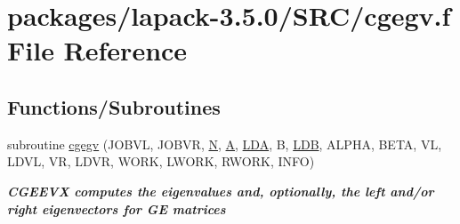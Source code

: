 \hypertarget{cgegv_8f}{}\section{packages/lapack-\/3.5.0/\+S\+R\+C/cgegv.f File Reference}
\label{cgegv_8f}
\subsection*{Functions/\+Subroutines}
\begin{DoxyCompactItemize}
\item 
subroutine \hyperlink{group__complexGEeigen_ga193cdd210dd5b0451503fddee82947e1}{cgegv} (J\+O\+B\+V\+L, J\+O\+B\+V\+R, \hyperlink{polmisc_8c_a0240ac851181b84ac374872dc5434ee4}{N}, \hyperlink{classA}{A}, \hyperlink{example__user_8c_ae946da542ce0db94dced19b2ecefd1aa}{L\+D\+A}, B, \hyperlink{example__user_8c_a50e90a7104df172b5a89a06c47fcca04}{L\+D\+B}, A\+L\+P\+H\+A, B\+E\+T\+A, V\+L, L\+D\+V\+L, V\+R, L\+D\+V\+R, W\+O\+R\+K, L\+W\+O\+R\+K, R\+W\+O\+R\+K, I\+N\+F\+O)
\begin{DoxyCompactList}\small\item\em {\bfseries  C\+G\+E\+E\+V\+X computes the eigenvalues and, optionally, the left and/or right eigenvectors for G\+E matrices} \end{DoxyCompactList}\end{DoxyCompactItemize}
